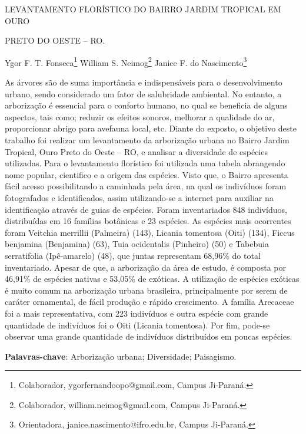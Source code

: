 \documentclass[article,12pt,onesidea,4paper,english,brazil]{abntex2}
\begin{document}
	
	
	\frenchspacing 
	
	\begin{center}
		\LARGE LEVANTAMENTO FLORÍSTICO DO BAIRRO JARDIM TROPICAL EM OURO
		
		PRETO DO OESTE – RO.
		
		\normalsize
		Ygor F. T. Fonseca\footnote{Colaborador, ygorfernandoopo@gmail.com, Campus Ji-Paraná.} 
		William S. Neimog\footnote{Colaborador, william.neimog@gmail.com, Campus Ji-Paraná.} 
		Janice F. do Nascimento\footnote{Orientadora, janice.nascimento@ifro.edu.br, Campus Ji-Paraná.} 
		 
	\end{center}
	
	\noindent As árvores são de suma importância e indispensáveis para o desenvolvimento
	urbano, sendo considerado um fator de salubridade ambiental. No entanto, a
	arborização é essencial para o conforto humano, no qual se beneficia de alguns
	aspectos, tais como; reduzir os efeitos sonoros, melhorar a qualidade do ar,
	proporcionar abrigo para avefauna local, etc. Diante do exposto, o objetivo deste
	trabalho foi realizar um levantamento da arborização urbana no Bairro Jardim
	Tropical, Ouro Preto do Oeste – RO, e analisar a diversidade de espécies utilizadas.
	Para o levantamento florístico foi utilizada uma tabela abrangendo nome popular,
	cientifico e a origem das espécies. Visto que, o Bairro apresenta fácil acesso
	possibilitando a caminhada pela área, na qual os indivíduos foram fotografados e
	identificados, assim utilizando-se a internet para auxiliar na identificação através de
	guias de espécies. Foram inventariados 848 indivíduos, distribuídas em 16 famílias
	botânicas e 23 espécies. As espécies mais ocorrentes foram Veitchia merrillii
	(Palmeira) (143), Licania tomentosa (Oiti) (134), Ficcus benjamina (Benjamina) (63),
	Tuia ocidentalis (Pinheiro) (50) e Tabebuia serratifolia (Ipê-amarelo) (48), que juntas
	representam 68,96\% do total inventariado. Apesar de que, a arborização da área de
	estudo, é composta por 46,91\% de espécies nativas e 53,05\% de exóticas. A
	utilização de espécies exóticas é muito comum na arborização urbana brasileira,
	principalmente por serem de caráter ornamental, de fácil produção e rápido
	crescimento. A família Arecaceae foi a mais representativa, com 223 indivíduos e
	outra espécie com grande quantidade de indivíduos foi o Oiti (Licania tomentosa).
	Por fim, pode-se observar uma grande quantidade de indivíduos distribuídos em
	poucas espécies.
	
	\vspace{\onelineskip}
	
	\noindent
	\textbf{Palavras-chave}: Arborização urbana; Diversidade; Paisagismo.
	
\end{document}
